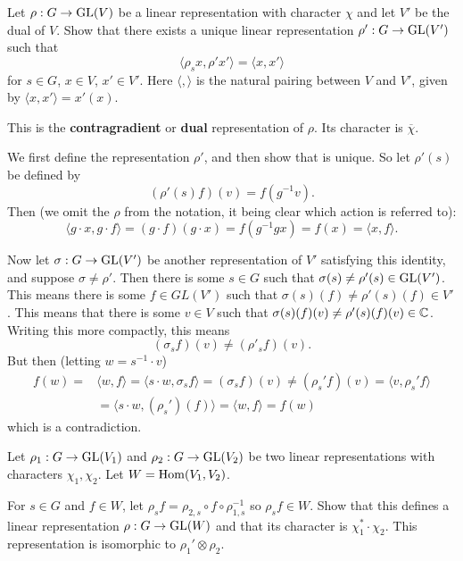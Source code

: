 \documentclass[11pt, english]{article}
\begin{document}
\begin{exc}[Excercise 2.3]
Let $\rho:G \to \operatorname{GL}(V)$ be a linear representation with character $\chi$ and let $V'$ be the dual of $V$. Show that there exists a unique linear representation $\rho':G \to \operatorname{GL}(V')$ such that
$$
\langle \rho_s x, \rho' x' \rangle = \langle x, x' \rangle
$$  
for $s \in G$, $x \in V$, $x' \in V'$. Here $\langle,\rangle$ is the natural pairing between $V$ and $V'$, given by $\langle x,x' \rangle = x'(x)$. 

This is the \textbf{contragradient} or \textbf{dual} representation of $\rho$. Its character is $\overline \chi$.
\end{exc}

\begin{sol}
  We first define the representation $\rho'$, and then show that is unique. So let $\rho'(s)$ be defined by
$$
(\rho'(s) f)(v) = f(g^{-1} v).
$$
Then (we omit the $\rho$ from the notation, it being clear which action is referred to):
$$
\langle g \cdot x, g \cdot f \rangle = (g \cdot f)(g \cdot x) = f(g^{-1} gx ) = f(x) = \langle x, f \rangle.
$$

Now let $\sigma:G \to \operatorname{GL}(V')$ be another representation of $V'$ satisfying this identity, and suppose $\sigma \neq \rho'$. Then there is some $s \in G$ such that $\sigma(s) \neq \rho'(s) \in \operatorname{GL}(V')$. This means there is some $f \in GL(V')$ such that $\sigma(s)(f) \neq \rho'(s)(f) \in V'$. This means that there is some $v \in V$ such that $\sigma(s)(f)(v) \neq \rho'(s)(f)(v) \in \mathbb{C}$. Writing this more compactly, this means
$$
(\sigma_s f)(v) \neq (\rho'_s f)(v).
$$
But then (letting $w = s^{-1} \cdot v$)
\begin{align*}
f(w) =& \langle w,f\rangle = \langle s \cdot w, \sigma_s f \rangle= ( \sigma_s 
f)(v) \neq (\rho_s' f)(v) = \langle v, \rho_s' f \rangle \\
&= \langle s \cdot w, (\rho_s')(f) \rangle = \langle w, f \rangle = f(w)
\end{align*}
which is a contradiction.
\end{sol}

\begin{exc}
  Let $\rho_1:G \to \operatorname{GL}(V_1)$ and $\rho_2:G \to \operatorname{GL}(V_2)$ be two linear representations with characters $\chi_1, \chi_2$. Let $W= \operatorname{Hom}(V_1,V_2)$. 

For $s \in G$ and $f \in W$, let $\rho_s f = \rho_{2,s} \circ f \circ \rho_{1,s}^{-1}$ so $\rho_s f \in W$. Show that this defines a linear representation $\rho:G \to \operatorname{GL}(W)$ and that its character is $\chi_1^\ast \cdot \chi_2$. This representation is isomorphic to $\rho_1' \otimes \rho_2$.
\end{exc}
\end{document}
